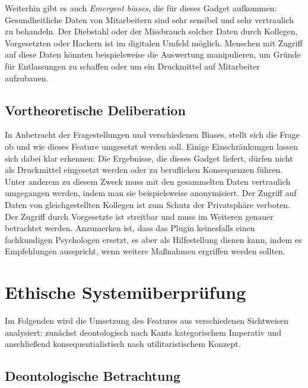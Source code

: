 \documentclass[a4paper,12pt,]{article}
\begin{document}
Weiterhin gibt es auch \emph{Emergent biases}, die für dieses Gadget aufkommen: Gesundheitliche Daten von Mitarbeitern sind sehr sensibel und sehr vertraulich zu behandeln. Der Diebstahl oder der Missbrauch solcher Daten durch Kollegen, Vorgesetzten oder Hackern ist im digitalen Umfeld möglich. Menschen mit Zugriff auf diese Daten könnten beispielsweise die Auswertung manipulieren, um Gründe für Entlassungen zu schaffen oder um ein Druckmittel auf Mitarbeiter aufzubauen.

\subsection{Vortheoretische Deliberation}
In Anbetracht der Fragestellungen und verschiedenen Biases, stellt sich die Frage ob und wie dieses Feature umgesetzt werden soll. Einige Einschränkungen lassen sich dabei klar erkennen: Die Ergebnisse, die dieses Gadget liefert, dürfen nicht als Druckmittel eingesetzt werden oder zu beruflichen Konsequenzen führen. Unter anderem zu diesem Zweck muss mit den gesammelten Daten vertraulich umgegangen werden, indem man sie beispielsweise anonymisiert. Der Zugriff auf Daten von gleichgestellten Kollegen ist zum Schutz der Privatsphäre verboten. Der Zugriff durch Vorgesetzte ist streitbar und muss im Weiteren genauer betrachtet werden. 
Anzumerken ist, dass das Plugin keinesfalls einen fachkundigen Psychologen ersetzt, es aber als Hilfestellung dienen kann, indem es Empfehlungen ausspricht, wenn weitere Maßnahmen ergriffen werden sollten.

\section{Ethische Systemüberprüfung}

Im Folgenden wird die Umsetzung des Features aus verschiedenen
Sichtweisen analysiert: zunächst deontologisch nach Kants kategorischem
Imperativ und anschließend konsequentialistisch nach utilitaristischem
Konzept.

\subsection{Deontologische Betrachtung}
\end{document}
